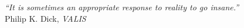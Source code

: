 \cleardoublepage
\thispagestyle{plain}

\vspace*{8cm}

\begin{flushright}
   \textsl{``It is sometimes an appropriate response to reality to go insane.''} \\
\vspace*{1.5cm}
           Philip K. Dick, \textit{VALIS}
\end{flushright}

